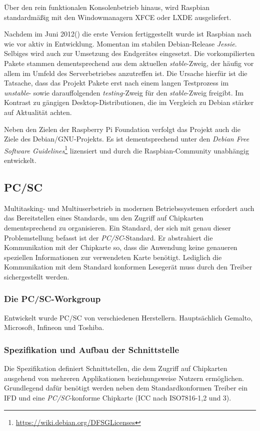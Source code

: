 Über den rein funktionalen Konsolenbetrieb hinaus, wird Raspbian standardmäßig mit den
Windowmanagern XFCE oder LXDE ausgeliefert.

Nachdem im Juni 2012(\cite{raspbianweb}) die erste
Version fertiggestellt wurde ist Raspbian nach wie vor aktiv
in Entwicklung. Momentan im stabilen Debian-Release \textit{Jessie}.
Selbiges wird auch zur Umsetzung des Endgerätes eingesetzt.
Die vorkompilierten Pakete stammen dementsprechend aus dem aktuellen
\textit{stable}-Zweig, der häufig vor allem im Umfeld des Serverbetriebes
anzutreffen ist. Die Ursache hierfür ist die Tatsache, dass das
Projekt Pakete erst nach einem langen Testprozess im \textit{unstable}-
sowie darauffolgenden \textit{testing-}Zweig für den \textit{stable}-Zweig
freigibt. Im Kontrast zu gängigen Desktop-Distributionen, die
im Vergleich zu Debian stärker auf Aktualität achten.

Neben den Zielen der Raspberry Pi Foundation verfolgt das Projekt
auch die Ziele des Debian/GNU-Projekts. Es ist dementsprechend unter
den \textit{Debian Free Software Guidelines}\footnote{\url{https://wiki.debian.org/DFSGLicenses}}
lizensiert und durch die Raspbian-Community unabhängig entwickelt.

\subsection{PC/SC}
Multitasking- und Multiuserbetrieb in modernen Betriebssystemen erfordert
auch das Bereitstellen eines Standards, um den Zugriff auf Chipkarten
dementsprechend zu organisieren. Ein Standard, der sich mit genau
dieser Problemstellung befasst ist der \textit{\ac{PC/SC}}-Standard.
Er abstrahiert die Kommunikation mit der Chipkarte so,
dass die Anwendung keine genaueren speziellen Informationen zur verwendeten
Karte benötigt. Lediglich die Kommunikation mit dem Standard
konformen Lesegerät muss durch den Treiber sichergestellt werden.

\subsubsection{Die PC/SC-Workgroup}
Entwickelt wurde PC/SC von verschiedenen Herstellern. Hauptsächlich
Gemalto, Microsoft, Infineon und Toshiba.

\subsubsection{Spezifikation und Aufbau der Schnittstelle}
Die Spezifikation definiert Schnittstellen, die dem Zugriff auf Chipkarten ausgehend
von mehreren Applikationen beziehungsweise Nutzern ermöglichen. Grundlegend
dafür benötigt werden neben dem Standardkonformen Treiber ein \ac{IFD} und
eine \textit{PC/SC}-konforme Chipkarte (\ac{ICC} nach ISO7816-1,2 und 3).

